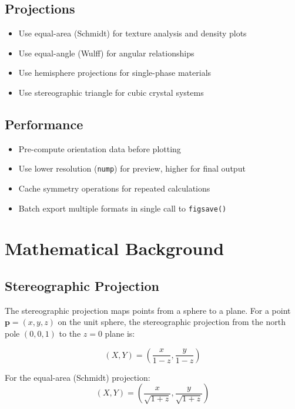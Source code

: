 \documentclass[11pt,a4paper]{article}
\begin{document}
\subsection{Projections}
\begin{itemize}[leftmargin=*]
    \item Use equal-area (Schmidt) for texture analysis and density plots
    \item Use equal-angle (Wulff) for angular relationships
    \item Use hemisphere projections for single-phase materials
    \item Use stereographic triangle for cubic crystal systems
\end{itemize}

\subsection{Performance}
\begin{itemize}[leftmargin=*]
    \item Pre-compute orientation data before plotting
    \item Use lower resolution (\texttt{nump}) for preview, higher for final output
    \item Cache symmetry operations for repeated calculations
    \item Batch export multiple formats in single call to \texttt{figsave()}
\end{itemize}

\section{Mathematical Background}

\subsection{Stereographic Projection}

The stereographic projection maps points from a sphere to a plane. For a point $\mathbf{p} = (x, y, z)$ on the unit sphere, the stereographic projection from the north pole $(0, 0, 1)$ to the $z = 0$ plane is:

\begin{equation}
(X, Y) = \left(\frac{x}{1-z}, \frac{y}{1-z}\right)
\end{equation}

For the equal-area (Schmidt) projection:
\begin{equation}
(X, Y) = \left(\frac{x}{\sqrt{1+z}}, \frac{y}{\sqrt{1+z}}\right)
\end{equation}
\end{document}
